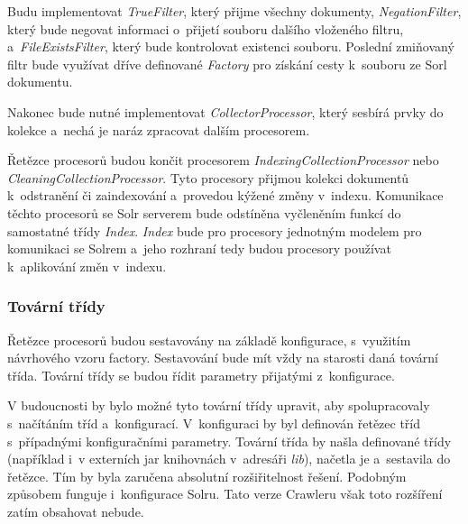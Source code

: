 Budu implementovat \emph{TrueFilter}, který přijme všechny dokumenty, \emph{NegationFilter}, který bude negovat informaci o~přijetí souboru dalšího vloženého filtru, a~\emph{FileExistsFilter}, který bude kontrolovat existenci souboru. Poslední zmiňovaný filtr bude využívat dříve definované \emph{Factory} pro získání cesty k~souboru ze Sorl dokumentu.

Nakonec bude nutné implementovat \emph{CollectorProcessor}, který sesbírá prvky do kolekce a~nechá je naráz zpracovat dalším procesorem.

Řetězce procesorů budou končit procesorem \emph{IndexingCollectionProcessor} nebo \emph{CleaningCollectionProcessor}. Tyto procesory přijmou kolekci dokumentů k~odstranění či zaindexování a~provedou kýžené změny v~indexu. Komunikace těchto procesorů se Solr serverem bude odstíněna vyčleněním funkcí do samostatné třídy \emph{Index}. \emph{Index} bude pro procesory jednotným modelem pro komunikaci se Solrem a~jeho rozhraní tedy budou procesory používat k~aplikování změn v~indexu.

\subsubsection{Tovární třídy}
Řetězce procesorů budou sestavovány na základě konfigurace, s~využitím návrhového vzoru factory. Sestavování bude mít vždy na starosti daná tovární třída. Tovární třídy se budou řídit parametry přijatými z~konfigurace.

V budoucnosti by bylo možné tyto tovární třídy upravit, aby spolupracovaly s~načítáním tříd a~konfigurací. V~konfiguraci by byl definován řetězec tříd s~případnými konfiguračními parametry. Tovární třída by našla definované třídy (například i~v externích jar knihovnách v~adresáři \emph{lib}), načetla je a~sestavila do řetězce. Tím by byla zaručena absolutní rozšiřitelnost řešení. Podobným způsobem funguje i~konfigurace Solru. Tato verze Crawleru však toto rozšíření zatím obsahovat nebude.

